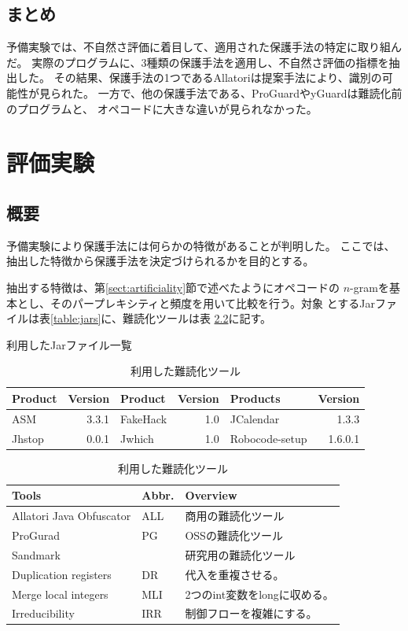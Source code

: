 \documentclass[12pt,twoside]{jbook}
\begin{document}
\section{まとめ}

予備実験では、不自然さ評価に着目して、適用された保護手法の特定に取り組んだ。
実際のプログラムに、3種類の保護手法を適用し、不自然さ評価の指標を抽出した。
その結果、保護手法の1つであるAllatoriは提案手法により、識別の可能性が見られた。
一方で、他の保護手法である、ProGuardやyGuardは難読化前のプログラムと、
オペコードに大きな違いが見られなかった。

\chapter{評価実験}

\section{概要}


予備実験により保護手法には何らかの特徴があることが判明した。
ここでは、抽出した特徴から保護手法を決定づけられるかを目的とする。

抽出する特徴は、第\ref{sect:artificiality}節で述べたようにオペコードの
$n$-gramを基本とし、そのパープレキシティと頻度を用いて比較を行う。対象
とするJarファイルは表\ref{table:jars}に、難読化ツールは表
\ref{table:tools}に記す。

\begin{table}[t]
  \centering
  \footnotesize{
    \caption{利用したJarファイル一覧}\label{table:jars}
  \begin{tabular}{l|r||l|r||l|r}
    Product & Version & Product & Version & Products & Version \\ \hline
    ASM       & 3.3.1 & FakeHack  & 1.0 &JCalendar & 1.3.3   \\
    Jhstop    & 0.0.1 & Jwhich    & 1.0   & Robocode-setup & 1.6.0.1 
  \end{tabular}
  \caption{利用した難読化ツール}\label{table:tools}
  \begin{tabular}{ll|l}
      Tools & Abbr. & Overview \\ \hline
      Allatori Java Obfuscator & ALL & 商用の難読化ツール \\ \hline
      ProGurad                 & PG & OSSの難読化ツール \\ \hline
      Sandmark                 & & 研究用の難読化ツール \\
      \hspace{0.2cm} Duplication registers & DR & 代入を重複させる。\\
      \hspace{0.2cm} Merge local integers & MLI & 2つのint変数をlongに収める。\\
      \hspace{0.2cm} Irreducibility       & IRR & 制御フローを複雑にする。\\
  \end{tabular}}
\end{table}
\end{document}
